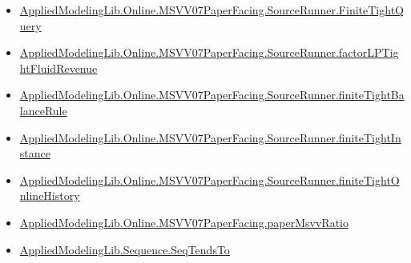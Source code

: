 \documentclass[10pt]{article}
\begin{document}
\begin{itemize}
\item \hyperlink{governing-declaration-feae64ffc2ccaca7}{Applied\allowbreak{}Modeling\allowbreak{}Lib.\allowbreak{}Online.\allowbreak{}MSVV07\allowbreak{}Paper\allowbreak{}Facing.\allowbreak{}Source\allowbreak{}Runner.\allowbreak{}Finite\allowbreak{}Tight\allowbreak{}Query}
\item \hyperlink{governing-declaration-d1dba4e6c290de54}{Applied\allowbreak{}Modeling\allowbreak{}Lib.\allowbreak{}Online.\allowbreak{}MSVV07\allowbreak{}Paper\allowbreak{}Facing.\allowbreak{}Source\allowbreak{}Runner.\allowbreak{}factor\allowbreak{}LP\allowbreak{}Tight\allowbreak{}Fluid\allowbreak{}Revenue}
\item \hyperlink{governing-declaration-b67fc5ed318eaef4}{Applied\allowbreak{}Modeling\allowbreak{}Lib.\allowbreak{}Online.\allowbreak{}MSVV07\allowbreak{}Paper\allowbreak{}Facing.\allowbreak{}Source\allowbreak{}Runner.\allowbreak{}finite\allowbreak{}Tight\allowbreak{}Balance\allowbreak{}Rule}
\item \hyperlink{governing-declaration-a1384cbd1c9eb5e4}{Applied\allowbreak{}Modeling\allowbreak{}Lib.\allowbreak{}Online.\allowbreak{}MSVV07\allowbreak{}Paper\allowbreak{}Facing.\allowbreak{}Source\allowbreak{}Runner.\allowbreak{}finite\allowbreak{}Tight\allowbreak{}Instance}
\item \hyperlink{governing-declaration-3dcb95825f7face3}{Applied\allowbreak{}Modeling\allowbreak{}Lib.\allowbreak{}Online.\allowbreak{}MSVV07\allowbreak{}Paper\allowbreak{}Facing.\allowbreak{}Source\allowbreak{}Runner.\allowbreak{}finite\allowbreak{}Tight\allowbreak{}Online\allowbreak{}History}
\item \hyperlink{governing-declaration-11865634591d1a39}{Applied\allowbreak{}Modeling\allowbreak{}Lib.\allowbreak{}Online.\allowbreak{}MSVV07\allowbreak{}Paper\allowbreak{}Facing.\allowbreak{}paper\allowbreak{}Msvv\allowbreak{}Ratio}
\item \hyperlink{governing-declaration-ed891837c3cd4610}{Applied\allowbreak{}Modeling\allowbreak{}Lib.\allowbreak{}Sequence.\allowbreak{}Seq\allowbreak{}Tends\allowbreak{}To}
\end{itemize}
\end{document}

